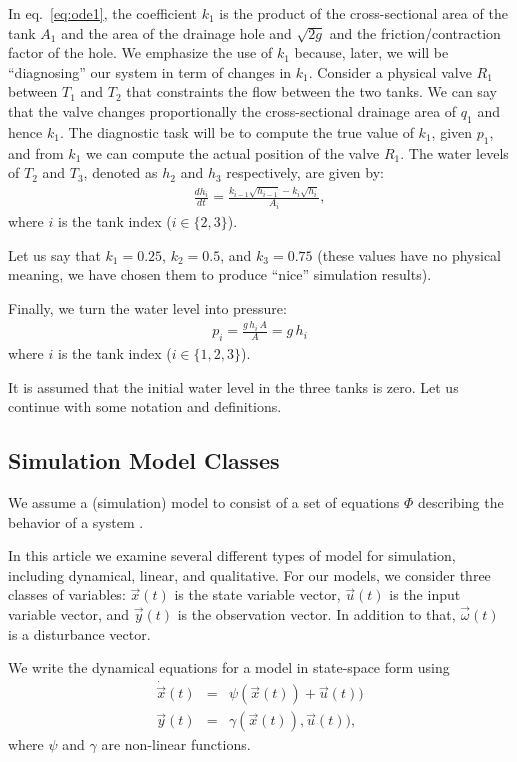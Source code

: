 %
In eq.~\ref{eq:ode1}, the coefficient $k_1$ is the product of the
cross-sectional area of the tank $A_1$ and the area of the drainage
hole and $\sqrt{2g}$ and the friction/contraction factor of the
hole. We emphasize the use of $k_1$ because, later, we will be
``diagnosing'' our system in term of changes in $k_1$. Consider a
physical valve $R_1$ between $T_1$ and $T_2$ that constraints the flow
between the two tanks. We can say that the valve changes
proportionally the cross-sectional drainage area of $q_1$ and hence
$k_1$. The diagnostic task will be to compute the true value of $k_1$,
given $p_1$, and from $k_1$ we can compute the actual position of the
valve $R_1$.
%
The water levels of $T_2$ and $T_3$, denoted as $h_2$ and $h_3$
respectively, are given by:
%
\begin{eqnarray}\label{eq:tank1}
%
\frac{d h_i}{dt} = \frac{k_{i - 1} \sqrt{h_{i - 1}} - k_i \sqrt{h_i}}{A_i},
%
\end{eqnarray}
%
where $i$ is the tank index ($i \in \{2, 3\}$).
\par
Let us say that $k_1 = 0.25$, $k_2 = 0.5$, and $k_3 = 0.75$ (these
values have no physical meaning, we have chosen them to produce
``nice'' simulation results).
\par
Finally, we turn the water level into pressure:
\begin{eqnarray}
p_i = \frac{g\,h_i\,A}{A} = g\,h_i
\end{eqnarray}
where $i$ is the tank index ($i \in \{1, 2, 3\}$).
\par
It is assumed that the initial water level in the three tanks is zero.
%
Let us continue with some notation and definitions.
%
\subsection{Simulation Model Classes}
%
We assume a (simulation) model to consist of a set of equations $\Phi$
describing the behavior of a system \sd.

In this article we examine several different types of model for
simulation, including dynamical, linear, and qualitative. For our
models, we consider three classes of variables: $\vec{x}(t)$ is the
state variable vector, $\vec{u}(t)$ is the input variable vector, and
$\vec{y}(t)$ is the observation vector. In addition to that,
$\vec{\omega}(t)$ is a disturbance vector.

\begin{definition}
We write the dynamical equations for a model in state-space form using
\begin{eqnarray}\label{dyn-model}
\dot{\vec{x}}(t) & = & \psi (\vec{x}(t)) + \vec{u}(t))\\
\vec{y}(t) & = & \gamma (\vec{x}(t)), \vec{u}(t)),
\end{eqnarray}
where $\psi$ and $\gamma$ are non-linear functions.
\end{definition}

